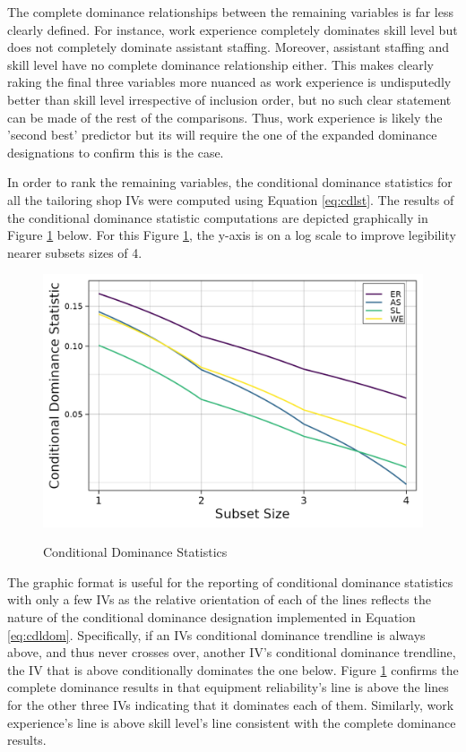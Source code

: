 \documentclass[ShortAfour,times,sageapa]{sagej}
\begin{document}
	The complete dominance relationships between the remaining variables is far less clearly defined. 
	For instance, work experience completely dominates skill level but does not completely dominate assistant staffing.
	Moreover, assistant staffing and skill level have no complete dominance relationship either.
	This makes clearly raking the final three variables more nuanced as work experience is undisputedly better than skill level irrespective of inclusion order, but no such clear statement can be made of the rest of the comparisons.
	Thus, work experience is likely the 'second best' predictor but its will require the one of the expanded dominance designations to confirm this is the case.
	
	In order to rank the remaining variables, the conditional dominance statistics for all the tailoring shop IVs were computed using Equation \ref{eq:cdlst}.
	The results of the conditional dominance statistic computations are depicted graphically in Figure \ref{fg:cdl} below.
	For this Figure \ref{fg:cdl}, the y-axis is on a log scale to improve legibility nearer subsets sizes of 4.
	
	\begin{figure}[h!]
		\centering
		\caption{Conditional Dominance Statistics}
		\includegraphics{includes/condit_gph}
		\label{fg:cdl}
	\end{figure}

	The graphic format is useful for the reporting of conditional dominance statistics with only a few IVs as the relative orientation of each of the lines reflects the nature of the conditional dominance designation implemented in Equation \ref{eq:cdldom}.
	Specifically, if an IVs conditional dominance trendline is always above, and thus never crosses over, another IV's conditional dominance trendline, the IV that is above conditionally dominates the one below.
	Figure \ref{fg:cdl} confirms the complete dominance results in that equipment reliability's line is above the lines for the other three IVs indicating that it dominates each of them.
	Similarly, work experience's line is above skill level's line consistent with the complete dominance results.
	
\end{document}
